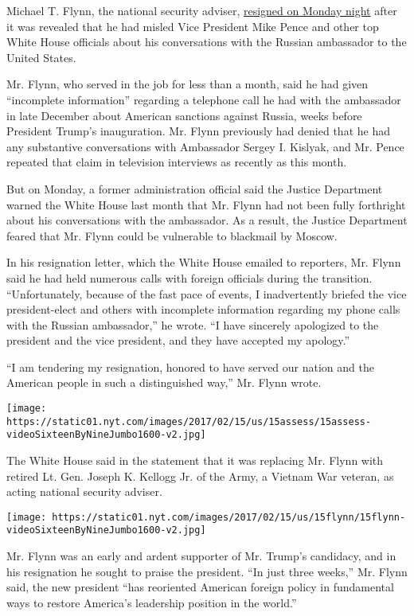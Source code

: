 Michael T. Flynn, the national security adviser,
\href{http://www.nytimes.com/interactive/2017/02/13/us/politics/document-Michael-Flynn-Resignation-Letter.html}{resigned
on Monday night} after it was revealed that he had misled Vice President
Mike Pence and other top White House officials about his conversations
with the Russian ambassador to the United States.

Mr. Flynn, who served in the job for less than a month, said he had
given ``incomplete information'' regarding a telephone call he had with
the ambassador in late December about American sanctions against Russia,
weeks before President Trump's inauguration. Mr. Flynn previously had
denied that he had any substantive conversations with Ambassador Sergey
I. Kislyak, and Mr. Pence repeated that claim in television interviews
as recently as this month.

But on Monday, a former administration official said the Justice
Department warned the White House last month that Mr. Flynn had not been
fully forthright about his conversations with the ambassador. As a
result, the Justice Department feared that Mr. Flynn could be vulnerable
to blackmail by Moscow.

In his resignation letter, which the White House emailed to reporters,
Mr. Flynn said he had held numerous calls with foreign officials during
the transition. ``Unfortunately, because of the fast pace of events, I
inadvertently briefed the vice president-elect and others with
incomplete information regarding my phone calls with the Russian
ambassador,'' he wrote. ``I have sincerely apologized to the president
and the vice president, and they have accepted my apology.''

``I am tendering my resignation, honored to have served our nation and
the American people in such a distinguished way,'' Mr. Flynn wrote.

\texttt{[image: https://static01.nyt.com/images/2017/02/15/us/15assess/15assess-videoSixteenByNineJumbo1600-v2.jpg]}

The White House said in the statement that it was replacing Mr. Flynn
with retired Lt. Gen. Joseph K. Kellogg Jr. of the Army, a Vietnam War
veteran, as acting national security adviser.

\texttt{[image: https://static01.nyt.com/images/2017/02/15/us/15flynn/15flynn-videoSixteenByNineJumbo1600-v2.jpg]}

Mr. Flynn was an early and ardent supporter of Mr. Trump's candidacy,
and in his resignation he sought to praise the president. ``In just
three weeks,'' Mr. Flynn said, the new president ``has reoriented
American foreign policy in fundamental ways to restore America's
leadership position in the world.''

